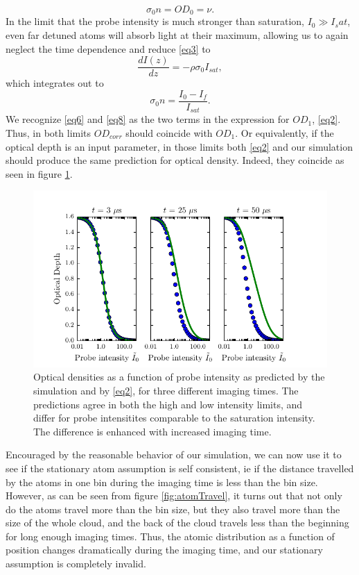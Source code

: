 \documentclass[12pt]{iopart}
\begin{document}
\begin{equation}
\sigma_0 n = OD_0 = \nu. \label{eq6}
\end{equation}
In the limit that the probe intensity is much stronger than saturation, $I_0\gg I_sat$, even far detuned atoms will absorb light at their maximum, allowing us to again neglect the time dependence and reduce \ref{eq3} to 
\begin{equation}
\frac{dI(z)}{dz}=-\rho\sigma_0 I_{sat}, 
\end{equation}
which integrates out to 
\begin{equation}
\sigma_0 n = \frac{I_0 - I_f}{I_{sat}}. \label{eq8}
\end{equation}
We recognize \ref{eq6} and \ref{eq8} as the two terms in the expression for $OD_1$, \ref{eq2}. Thus, in both limits $OD_{corr}$ should coincide with $OD_1$. Or equivalently, if the optical depth is an input parameter, in those limits both \ref{eq2} and our simulation should produce the same prediction for optical density. Indeed, they coincide as seen in figure \ref{fig:IsatLimits}.
\begin{figure}
	\includegraphics[scale=0.57]{figure3}
\caption{Optical densities as a function of probe intensity as predicted by the simulation and by \ref{eq2}, for three different imaging times. The predictions agree in both the high and low intensity limits, and differ for probe intensitites comparable to the saturation intensity. The difference is enhanced with increased imaging time.}  
\label{fig:IsatLimits}
\end{figure}
\par Encouraged by the reasonable behavior of our simulation, we can now use it to see if the stationary atom assumption is self consistent, ie if the distance travelled by the atoms in one bin during the imaging time is less than the bin size. However, as can be seen from figure \ref{fig:atomTravel}, it turns out that not only do the atoms travel more than the bin size, but they also travel more than the size of the whole cloud, and the back of the cloud travels less than the beginning for long enough imaging times. Thus, the atomic distribution as a function of position changes dramatically during the imaging time, and our stationary assumption is completely invalid. 
\end{document}
